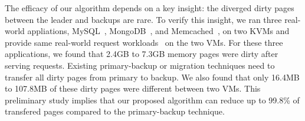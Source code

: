 The efficacy of our algorithm depends on a key insight: the diverged dirty 
pages between the leader and backups are rare. To verify this insight, we ran 
three real-world appliations, MySQL~\cite{mysql}, MongoDB~\cite{mongodb}, and 
Memcached~\cite{memcached}, on two KVMs and provide same real-world request 
workloads~\cite{sysbench} on the two VMs. For these three applications, we 
found that 2.4GB to 7.3GB memory pages were dirty after serving requests. 
Existing primary-backup or migration techniques need to transfer all dirty 
pages from primary to backup. We also found that only 16.4MB to 107.8MB of 
these dirty pages were different between two VMs. This preliminary study implies 
that our proposed algorithm can reduce up to 99.8\% of transfered pages 
compared to the primary-backup technique.




